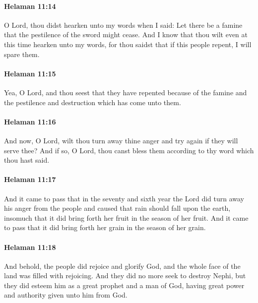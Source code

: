 		\paragraph{Helaman 11:14} %
			\label{HELAMAN-11-14}

			O Lord, thou didst hearken unto my words when I said:
			Let there be a famine that the pestilence of the sword might cease.
			And I know that thou wilt even at this time hearken unto my words,
			for thou saidst that if this people repent, I will spare them.

		\paragraph{Helaman 11:15} %
			\label{HELAMAN-11-15}

			Yea, O Lord, and thou seest that they have repented
			because of the famine and the pestilence and destruction
			which has come unto them.

		\paragraph{Helaman 11:16} %
			\label{HELAMAN-11-16}

			And now, O Lord, wilt thou turn away thine anger
			and try again if they will serve thee?
			And if so, O Lord, thou canst bless them
			according to thy word which thou hast said.

		\paragraph{Helaman 11:17} %
			\label{HELAMAN-11-17}

			And it came to pass that in the seventy and sixth year
			the Lord did turn away his anger from the people
			and caused that rain should fall upon the earth,
			insomuch that it did bring forth her fruit in the season of her fruit.
			And it came to pass that it did bring forth her grain in the season of her grain.

		\paragraph{Helaman 11:18} %
			\label{HELAMAN-11-18}

			And behold, the people did rejoice and glorify God,
			and the whole face of the land was filled with rejoicing.
			And they did no more seek to destroy Nephi,
			but they did esteem him as a great prophet and a man of God,
			having great power and authority given unto him from God.

